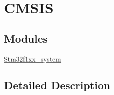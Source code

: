 \hypertarget{group__CMSIS}{}\section{C\+M\+S\+IS}
\label{group__CMSIS}
\subsection*{Modules}
\begin{DoxyCompactItemize}
\item 
\mbox{\hyperlink{group__stm32f1xx__system}{Stm32f1xx\+\_\+system}}
\end{DoxyCompactItemize}


\subsection{Detailed Description}
